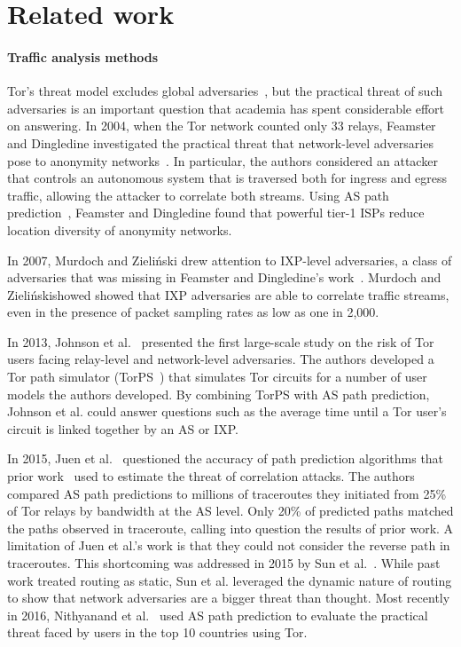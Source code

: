 \section{Related work}
\label{sec:related_work}

\paragraph{Traffic analysis methods}
Tor's threat model excludes global adversaries~\cite{Dingledine2004a}, but the
practical threat of such adversaries is an important question that academia has
spent considerable effort on answering.  In 2004, when the Tor network counted
only 33 relays, Feamster and Dingledine investigated the practical threat that
network-level adversaries pose to anonymity networks~\cite{Feamster2004a}.  In
particular, the authors considered an attacker that controls an autonomous
system that is traversed both for ingress and egress traffic, allowing the
attacker to correlate both streams.  Using AS path prediction~\cite{Gao2001a},
Feamster and Dingledine found that powerful tier-1 ISPs reduce location
diversity of anonymity networks.

In 2007, Murdoch and Zieli\'{n}ski drew attention to IXP-level adversaries, a
class of adversaries that was missing in Feamster and Dingledine's
work~\cite{Murdoch2007a}.  Murdoch and Zieli\'{n}skishowed showed that IXP
adversaries are able to correlate traffic streams, even in the presence of
packet sampling rates as low as one in 2,000.

In 2013, Johnson et al.~\cite{Johnson2013a} presented the first large-scale
study on the risk of Tor users facing relay-level and network-level
adversaries.  The authors developed a Tor path simulator (TorPS~\cite{TorPS})
that simulates Tor circuits for a number of user models the authors developed.
By combining TorPS with AS path prediction, Johnson et al. could answer
questions such as the average time until a Tor user's circuit is linked
together by an AS or IXP.

In 2015, Juen et al.~\cite{Juen2015a} questioned the accuracy of path
prediction algorithms that prior work~\cite{Johnson2013a,Feamster2004a} used to
estimate the threat of correlation attacks.  The authors compared AS path
predictions to millions of traceroutes they initiated from 25\% of Tor relays
by bandwidth at the AS level.  Only 20\% of predicted paths matched the paths
observed in traceroute, calling into question the results of prior work.  A
limitation of Juen et al.'s work is that they could not consider the reverse
path in traceroutes.  This shortcoming was addressed in 2015 by Sun et
al.~\cite{Sun2015a}.  While past work treated routing as static, Sun et al.
leveraged the dynamic nature of routing to show that network adversaries are a
bigger threat than thought.  Most recently in 2016, Nithyanand et
al.~\cite{Nithyanand2016a} used AS path prediction to evaluate the practical
threat faced by users in the top 10 countries using Tor.

